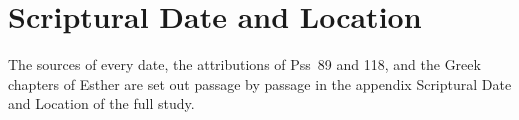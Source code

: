 

\section{Scriptural Date and Location}



\medskip
{\footnotesize\noindent The sources of every date, the attributions of Pss~89
and 118, and the Greek chapters of Esther are set out passage by passage in the
appendix Scriptural Date and Location of the full study.\par}
